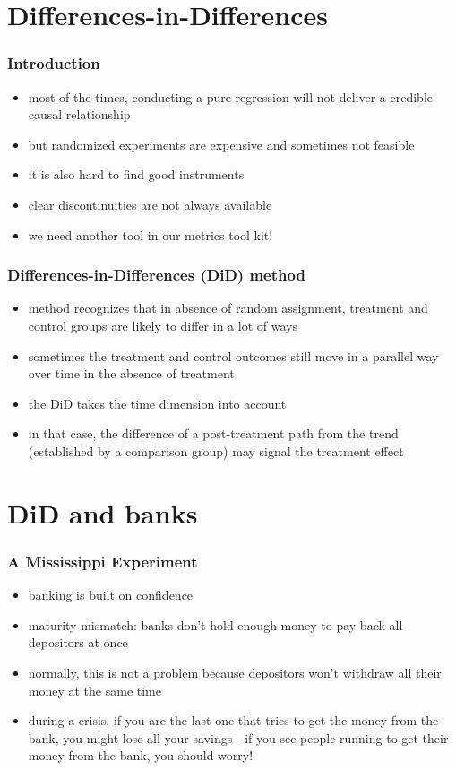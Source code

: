 \documentclass{beamer}
\begin{document}
\section{Differences-in-Differences}
\begin{frame}
\frametitle{Introduction}
\begin{itemize}
	\item most of the times, conducting a pure regression will not deliver a credible causal relationship
	\item but randomized experiments are expensive and sometimes not feasible
	\item it is also hard to find good instruments 
	\item clear discontinuities are not always available
	\item we need another tool in our metrics tool kit!
\end{itemize}

\end{frame}
\begin{frame}
\frametitle{Differences-in-Differences (DiD) method}
\begin{itemize}
	\item method recognizes that in absence of random assignment, treatment and control groups are likely to differ in a lot of ways
	\item sometimes the treatment and control outcomes still move in a parallel way over time in the absence of treatment
	\item the DiD takes the time dimension into account
	\item in that case, the difference of a post-treatment path from the trend (established by a comparison group) may signal the treatment effect
\end{itemize}

\end{frame}
\section{DiD and banks}
\begin{frame}
\frametitle{A Mississippi Experiment}
\begin{itemize}
	\item banking is built on confidence
	\item maturity mismatch: banks don't hold enough money to pay back all depositors at once
	\item normally, this is not a problem because depositors won't withdraw all their money at the same time
	\item during a crisis, if you are the last one that tries to get the money from the bank, you might lose all your savings - if you see people running to get their money from the bank, you should worry!
	
\end{itemize}

\end{frame}
\end{document}
